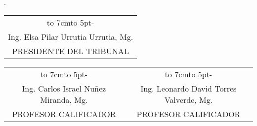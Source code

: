 \newpage
{}
\begin{flushright}
	\lugarFechaPrelims.
\end{flushright}


\vspace*{4cm}
\begin{center}
	\begin{tabular}{c}
		\hbox to 7cm{\leaders\hbox to 5pt{\hss - \hss}\hfil} \\
		Ing. Elsa Pilar Urrutia Urrutia, Mg.                 \\
		PRESIDENTE DEL TRIBUNAL                              \\
	\end{tabular}
\end{center}
\vspace*{20mm}
\begin{center}
	\begin{tabular}{c c}
		\hbox to 7cm{\leaders\hbox to 5pt{\hss - \hss}\hfil} & \hbox to 7cm{\leaders\hbox to 5pt{\hss - \hss}\hfil} \\
		Ing. Carlos Israel Nuñez Miranda, Mg.                & Ing. Leonardo David Torres Valverde, Mg.             \\
		PROFESOR CALIFICADOR                                 & PROFESOR CALIFICADOR
	\end{tabular}
\end{center}

